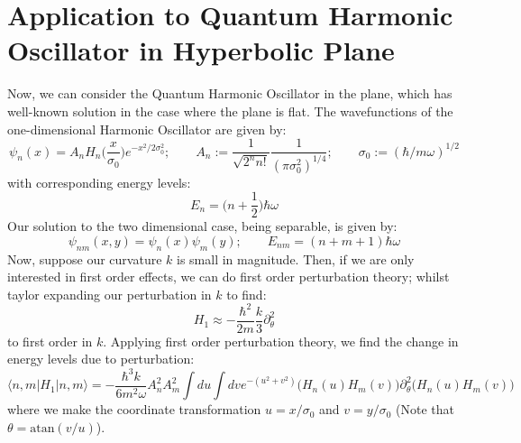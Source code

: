 \documentclass[12pt]{article}
\begin{document}
\section{Application to Quantum Harmonic Oscillator in Hyperbolic Plane}
Now, we can consider the Quantum Harmonic Oscillator in the plane, which has well-known solution in the case where the plane is flat. The wavefunctions of the one-dimensional Harmonic Oscillator are given by: 
$$\psi_n(x) = A_n H_n \bigg( \frac{x}{\sigma_0}\bigg) e^{-x^2/2\sigma_0^2};\qquad A_n := \frac{1}{\sqrt{2^n n!}} \frac{1}{(\pi \sigma_0^2)^{1/4}};\qquad \sigma_0 := (\hbar/m\omega)^{1/2} $$
with corresponding energy levels:
$$E_n = \bigg( n + \frac{1}{2} \bigg) \hbar \omega$$
Our solution to the two dimensional case, being separable, is given by:
$$\psi_{nm}(x,y) = \psi_n(x) \psi_m(y); \qquad E_{nm} = (n + m + 1) \hbar \omega$$
Now, suppose our curvature $k$ is small in magnitude. Then, if we are only interested in first order effects, we can do first order perturbation theory; whilst taylor expanding our perturbation in $k$ to find:
$$H_1 \approx -\frac{\hbar^2}{2m} \frac{k}{3} \partial_{\theta}^2$$
to first order in $k$. Applying first order perturbation theory, we find the change in energy levels due to perturbation:
$$\langle n,m | H_1 | n,m \rangle = -\frac{\hbar^3 k }{6m^2 \omega} A_n^2 A_m^2 \int du \int dv e^{-(u^2 + v^2)} \bigg(H_n( u ) H_m (v )\bigg) \partial_\theta^2 \bigg(H_n( u) H_m (v)\bigg) $$
where we make the coordinate transformation $u = x/\sigma_0$ and $v = y/\sigma_0$ (Note that $\theta = \text{atan} (v/u)$). 
\end{document}
